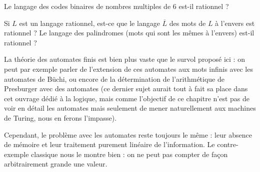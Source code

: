 \begin{exo}
    Le langage des codes binaires de nombres multiples de $6$ est-il rationnel ?
\end{exo}

\begin{exo}
    Si $L$ est un langage rationnel, est-ce que le langage $\overline L$ des mots de $L$ à l'envers est rationnel ? Le langage des palindromes (mots qui sont les mêmes à l'envers) est-il rationnel ?
\end{exo}

La théorie des automates finis est bien plus vaste que le survol proposé ici : on peut par exemple parler de l'extension de ces automates aux mots infinis avec les automates de Büchi, ou encore de la détermination de l'arithmétique de Presburger avec des automates (ce dernier sujet aurait tout à fait sa place dans cet ouvrage dédié à la logique, mais comme l'objectif de ce chapitre n'est pas de voir en détail les automates mais seulement de mener naturellement aux machines de Turing, nous en ferons l'impasse).

Cependant, le problème avec les automates reste toujours le même : leur absence de mémoire et leur traitement purement linéaire de l'information. Le contre-exemple classique nous le montre bien : on ne peut pas compter de façon arbitrairement grande une valeur.
